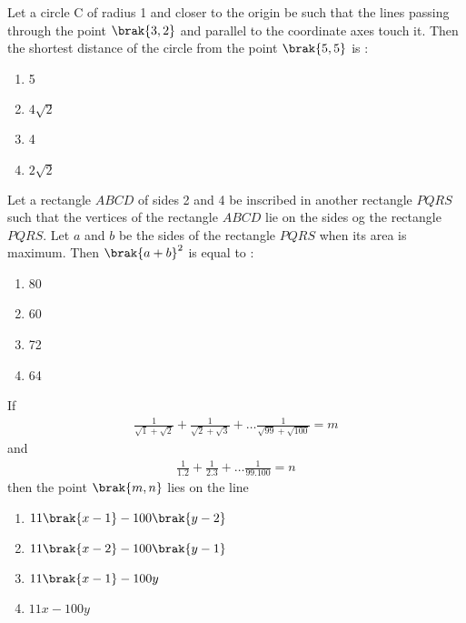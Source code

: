 \iffalse
    \title{2024}
    \author{EE24BTECH11001}
    \section{mcq-single}
\fi

\item 
	    Let a circle C of radius 1 and closer to the origin be such that the lines
        passing through the point $\brak{3, 2}$ and parallel to the coordinate axes touch it.
        Then the shortest distance of the circle from the point $\brak{5, 5}$ is :
		\hfill{}
	\begin{multicols}{4}
		\begin{enumerate}
			\item 5
			\columnbreak
        \item $4\sqrt{2}$
			\columnbreak
			\item 4
			\columnbreak
        \item $2\sqrt{2}$
		\end{enumerate}
	\end{multicols}

	\item
        Let a rectangle $ABCD$ of sides 2 and 4 be inscribed in another rectangle $PQRS$
        such that the vertices of the rectangle $ABCD$ lie on the sides og the rectangle $PQRS$.
        Let $a$ and $b$ be the sides of the rectangle $PQRS$ when its area is maximum. Then
        $\brak{a + b}^2$ is equal to :
		\begin{multicols}{4}
		\begin{enumerate}
			\item 80 \columnbreak
			\item 60 \columnbreak
			\item 72 \columnbreak
			\item 64
		\end{enumerate}
	\end{multicols}


\item If
	\begin{align}
        \frac{1}{\sqrt{1} + \sqrt{2}} + \frac{1}{\sqrt{2} + \sqrt{3}} + \dots \frac{1}{\sqrt{99} + \sqrt{100}} = m
	\end{align} and
    \begin{align}
        \frac{1}{1 . 2} + \frac{1}{2 . 3} + \dots \frac{1}{99 . 100} = n
    \end{align} then the point $\brak{m, n}$ lies on the line
		\hfill{}
		\begin{enumerate}
            \item $11\brak{x-1} - 100\brak{y-2}$ 
            \item $11\brak{x-2} - 100\brak{y-1}$ 
            \item $11\brak{x-1} - 100y$ 
            \item $11x - 100y$ 
		\end{enumerate}
		
